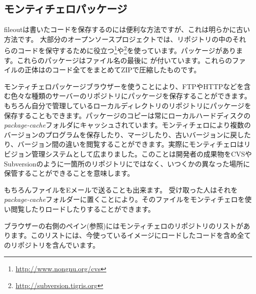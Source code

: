 \documentclass[a4paper,10pt,twoside]{book}
\begin{document}
\subsection{モンティチェロパッケージ}
fileoutは書いたコードを保存するのには便利な方法ですが、これは明らかに古い方法です。
大部分のオープンソースプロジェクトでは、リポジトリの中のそれらのコードを保守するために役立つ\footnote{\url{http://www.nongnu.org/cvs}}や\footnote{\url{http://subversion.tigris.org}}を使っています。パッケージがあります。これらのパッケージはファイル名の最後に が付いています。これらのファイルの正体はのコード全てをまとめてZIPで圧縮したものです。

モンティチェロパッケージブラウザーを使うことにより、FTPやHTTPなどを含む色々な種類のサーバーのリポジトリにパッケージを保存することができます。もちろん自分で管理しているローカルディレクトリのリポジトリにパッケージを保存することもできます。パッケージのコピーは常にローカルハードディスクの\emph{package-cache}フォルダにキャッシュされています。モンティチェロにより複数のバージョンのプログラムを保存したり、マージしたり、古いバージョンに戻したり、バージョン間の違いを閲覧することができます。実際にモンティチェロはリビジョン管理システムとして広まりました。このことは開発者の成果物をCVSやSubversionのように一箇所のリポジトリにではなく、いつくかの異なった場所に保管することができることを意味します。

もちろんファイルをEメールで送ることも出来ます。
受け取った人はそれを\emph{package-cache}フォルダーに置くことにより。そのファイルをモンティチェロを使い閲覧したりロードしたりすることができます。

ブラウザーの右側のペイン(参照)にはモンティチェロのリポジトリのリストがあります。このリストには、今使っているイメージにロードしたコードを含め全てのリポジトリを含んでいます。
\end{document}

